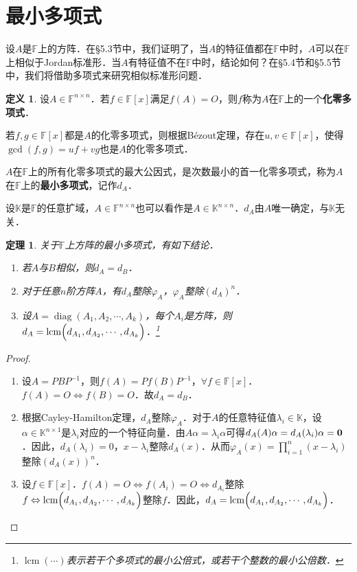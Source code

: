 \documentclass[a4paper,fontset=windows]{ctexbook}
\newtheorem{theorem}{定理}[chapter]
\theoremstyle{definition}
\newtheorem{definition}{定义}[chapter]
\DeclareMathOperator{\diag}{diag}
\DeclareMathOperator{\lcm}{lcm}
\def\note{\noindent\raisebox{10pt}{\dbend}\hspace{7pt}}
\begin{document}
\clearpage\section{最小多项式}

设$A$是$\mathbb{F}$上的方阵．在\S 5.3节中，我们证明了，当$A$的特征值都在$\mathbb{F}$中时，$A$可以在$\mathbb{F}$上相似于Jordan标准形．当$A$有特征值不在$\mathbb{F}$中时，结论如何？在\S 5.4节和\S 5.5节中，我们将借助多项式来研究相似标准形问题．

\begin{definition}\label{def5.5}
设$A\in\mathbb{F}^{n\times n}$．若$f\in\mathbb{F}[x]$满足$f(A)=O$，则$f$称为$A$在$\mathbb{F}$上的一个{\bf 化零多项式}．

若$f,g\in\mathbb{F}[x]$都是$A$的化零多项式，则根据B\'ezout定理，存在$u,v\in\mathbb{F}[x]$，使得$\gcd(f,g)=uf+vg$也是$A$的化零多项式．

$A$在$\mathbb{F}$上的所有化零多项式的最大公因式，是次数最小的首一化零多项式，称为$A$在$\mathbb{F}$上的{\bf 最小多项式}，记作$d_A$．
\end{definition}

\note 设$\mathbb{K}$是$\mathbb{F}$的任意扩域，$A\in\mathbb{F}^{n\times n}$也可以看作是$A\in\mathbb{K}^{n\times n}$．$d_A$由$A$唯一确定，与$\mathbb{K}$无关．

\begin{theorem}\label{thm5.13}
关于$\mathbb{F}$上方阵的最小多项式，有如下结论．
\begin{enumerate}
\item 若$A$与$B$相似，则$d_A=d_B$．

\item 对于任意$n$阶方阵$A$，有$d_A$整除$\varphi_A$，$\varphi_A$整除$(d_A)^n$．

\item 设$A=\diag(A_1,A_2,\cdots,A_k)$，每个$A_i$是方阵，则$d_A=\lcm\Bigl(d_{A_1},d_{A_2},\cdots,d_{A_k}\Bigr)$．\footnote{$\lcm(\cdots)$表示若干个多项式的最小公倍式，或若干个整数的最小公倍数．}
\end{enumerate}
\end{theorem}

\begin{proof}~
\begin{enumerate}
\item 设$A=PBP^{-1}$，则$f(A)=Pf(B)P^{-1}$，$\forall f\in\mathbb{F}[x]$．$f(A)=O\Leftrightarrow f(B)=O$．故$d_A=d_B$．

\item 根据Cayley-Hamilton定理，$d_A$整除$\varphi_A$．对于$A$的任意特征值$\lambda_i\in\mathbb{K}$，设$\alpha\in\mathbb{K}^{n\times 1}$是$\lambda_i$对应的一个特征向量．由$A\alpha=\lambda_i\alpha$可得$d_A(A)\alpha=d_A(\lambda_i)\alpha={\bf 0}$．因此，$d_A(\lambda_i)=0$，$x-\lambda_i$整除$d_A(x)$．从而$\varphi_A(x)=\prod\limits_{i=1}^n(x-\lambda_i)$整除$(d_A(x))^n$．

\item 设$f\in\mathbb{F}[x]$．$f(A)=O\Leftrightarrow f(A_i)=O\Leftrightarrow d_{A_i}$整除$f\Leftrightarrow\lcm\Bigl(d_{A_1},d_{A_2},\cdots,d_{A_k}\Bigr)$整除$f$．因此，$d_A=\lcm\Bigl(d_{A_1},d_{A_2},\cdots,d_{A_k}\Bigr)$．\qedhere
\end{enumerate}
\end{proof}
\end{document}
